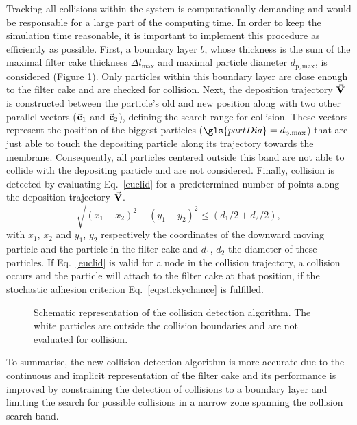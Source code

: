 Tracking all collisions within the system is computationally demanding and would be responsable for a large part of the computing time. In order to keep the simulation time reasonable, it is important to implement this procedure as efficiently as possible. First, a boundary layer $b$, whose thickness is the sum of the maximal filter cake thickness $\Delta l_\mathrm{max}$ and maximal particle diameter $d_\mathrm{p,max}$, is considered (Figure \ref{coldet}). Only particles within this boundary layer are close enough to the filter cake and are checked for collision. Next, the deposition trajectory $\vec{\mathbf{V}}$ is constructed between the particle's old and new position along with two other parallel vectors ($\vec{\mathbf{c}}_\mathrm{1}$ and $\vec{\mathbf{c}}_\mathrm{2}$), defining the search range for collision. These vectors represent the position of the biggest particles ($\gls{partDia}=d_\mathrm{p,max}$) that are just able to touch the depositing particle along its trajectory towards the membrane. Consequently, all particles centered outside this band are not able to collide with the depositing particle and are not considered. Finally, collision is detected by evaluating Eq.\ \eqref{euclid} for a predetermined number of points along the deposition trajectory $\vec{\mathbf{V}}$.  %
\begin{equation}
 \sqrt{(x_\mathrm{1}-x_\mathrm{2})^2 + (y_\mathrm{1}-y_\mathrm{2})^2} \leq (d_\mathrm{1}/2+d_\mathrm{2}/2), 
 \label{euclid}
\end{equation}
with $x_\mathrm{1}$, $x_\mathrm{2}$ and $y_\mathrm{1}$, $y_\mathrm{2}$ respectively the coordinates of the downward moving particle and the particle in the filter cake and $d_\mathrm{1}$, $d_\mathrm{2}$ the diameter of these particles. If Eq.\ \eqref{euclid} is valid for a node in the collision trajectory, a collision occurs and the particle will attach to the filter cake at that position, if the stochastic adhesion criterion Eq.\ \eqref{eq:stickychance} is fulfilled. \par %
\begin{figure}[H]
    \centering
    \def\svgwidth{0.7\columnwidth}
    
    \caption{Schematic representation of the collision detection algorithm. The white particles are outside the collision boundaries and are not evaluated for collision.}
    \label{coldet}
\end{figure}
To summarise, the new collision detection algorithm is more accurate due to the continuous and implicit representation of the filter cake and its performance is improved by constraining the detection of collisions to a boundary layer and limiting the search for possible collisions in a narrow zone spanning the collision search band. 


